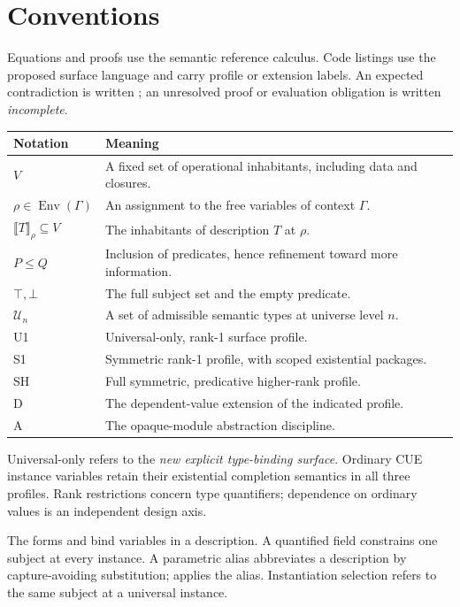 \documentclass[11pt,a4paper,oneside]{report}
\newcommand{\code}[1]{\texttt{\detokenize{#1}}}
\newcommand{\sem}[1]{\llbracket #1\rrbracket}
\newcommand{\Env}{\operatorname{Env}}
\newcommand{\U}{\mathcal U}
\newcommand{\Uone}{\ensuremath{\profilecal{U}_{1}}}
\newcommand{\Sone}{\ensuremath{\profilecal{S}_{1}}}
\newcommand{\Shigher}{\ensuremath{\profilecal{S}_{H}}}
\newcommand{\Dep}{\ensuremath{\profilecal{D}}}
\newcommand{\Abs}{\ensuremath{\profilecal{A}}}
\def\Uone{U1}%
\def\Sone{S1}%
\def\Shigher{SH}%
\def\Dep{D}%
\def\Abs{A}%
\theoremstyle{remark}
\begin{document}
\chapter*{Conventions}
Equations and proofs use the semantic reference calculus. Code listings use
the proposed surface language and carry profile or extension labels. An expected
contradiction is written \code{_|_}; an unresolved proof or evaluation obligation
is written \emph{incomplete}.

\begin{tabularx}{\textwidth}{@{}lY@{}}
\toprule
Notation & Meaning\\\midrule
$V$ & A fixed set of operational inhabitants, including data and closures.\\
$\rho\in\Env(\Gamma)$ & An assignment to the free variables of context $\Gamma$.\\
$\sem{T}_\rho\subseteq V$ & The inhabitants of description $T$ at $\rho$.\\
$P\le Q$ & Inclusion of predicates, hence refinement toward more information.\\
$\top,\bot$ & The full subject set and the empty predicate.\\
$\U_n$ & A set of admissible semantic types at universe level $n$.\\
\Uone{} & Universal-only, rank-1 surface profile.\\
\Sone{} & Symmetric rank-1 profile, with scoped existential packages.\\
\Shigher{} & Full symmetric, predicative higher-rank profile.\\
\Dep{} & The dependent-value extension of the indicated profile.\\
\Abs{} & The opaque-module abstraction discipline.\\
\bottomrule
\end{tabularx}

Universal-only refers to the \emph{new explicit type-binding surface}. Ordinary
CUE instance variables retain their existential completion semantics in all three
profiles. Rank restrictions concern type quantifiers; dependence on ordinary
values is an independent design axis.

The forms \code{forall (A, B) T} and \code{exists A { ... }} bind variables
in a description. A quantified field \code{f(A, B): T} constrains one subject
at every instance. A parametric alias \code{S(A) = T} abbreviates a description
by capture-avoiding substitution; \code{S(U)} applies the alias. Instantiation
selection \code{f[U]} refers to the same subject at a universal instance.
\end{document}
